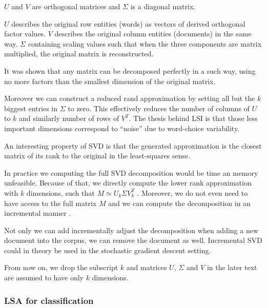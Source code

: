         $U$ and $V$ are orthogonal matrices and $\Sigma$ is a diagonal matrix.
        
        {}

        $U$ describes the original row entities (words) as vectors of derived orthogonal  factor values. 
        $V$ describes the original column entities (documents) in the same way.
        $\Sigma$ containing scaling values such that when the three components are matrix multiplied, the original matrix is reconstructed.

        It was shown that any matrix can be decomposed perfectly in a such way, using no more factors than the smallest dimension of the original matrix.
        
        Moreover we can construct a reduced rand approximation by setting all but the $k$ biggest entries in $\Sigma$ to zero. 
        This effectively reduces the number of columns of $U$ to $k$ and similarly number of rows of $V^T$.
        The thesis behind LSI is that those less important dimensions correspond to “noise” due to word-choice variability.
    
        An interesting property of SVD is that the generated approximation is the closest matrix of its rank to the original in the least-squares sense.

        In practice we computing the full SVD decomposition would be time an memory unfeasible.
        Because of that, we directly compute the lower rank approximation with $k$ dimensions,
        such that $M \simeq U_k \Sigma V_k^T$ \cite{halko2011finding}. %
        Moreover, we do not even need to have access to the full matrix $M$ and we can compute the decomposition in an incremental manner \cite{brand2006fast}. %
        
        Not only we can add incrementally adjust the decomposition when adding a new document into the corpus, we can remove the document as well.
        Incremental SVD could in theory be used in the stochastic gradient descent setting.
        
        From now on, we drop the subscript $k$ and matrices $U$, $\Sigma$ and $V$ in the later text are assumed to have only $k$ dimensions.
        
        \subsubsection{LSA for classification}
        
